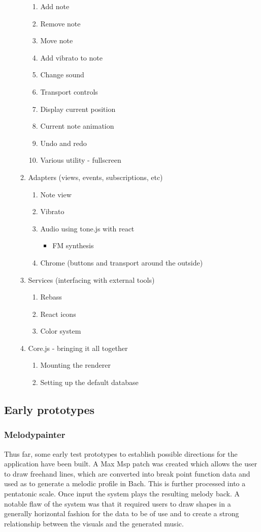 \documentclass[a4paper,12pt]{article}
\begin{document}
\begin{enumerate}
\begin{enumerate}
\begin{enumerate}
\item Add note
\item Remove note
\item Move note
\item Add vibrato to note
\item Change sound
\item Transport controls
\item Display current position
\item Current note animation
\item Undo and redo
\item Various utility - fullscreen
\end{enumerate}
\item Adapters (views, events, subscriptions, etc)
\begin{enumerate}
\item Note view
\item Vibrato
\item Audio using tone.js with react
\begin{itemize}
\item FM synthesis
\end{itemize}
\item Chrome (buttons and transport around the outside)
\end{enumerate}
\item Services (interfacing with external tools)
\begin{enumerate}
\item Rebass
\item React icons
\item Color system
\end{enumerate}
\item Core.js - bringing it all together
\begin{enumerate}
\item Mounting the renderer
\item Setting up the default database
\end{enumerate}
\end{enumerate}
\end{enumerate}

\subsection{Early prototypes}
\label{sec:org4b844ef}
\subsubsection{Melodypainter}
\label{sec:org25b5502}
Thus far, some early test prototypes to establish possible directions for the
application have been built. A Max Msp patch was created which allows the user
to draw freehand lines, which are converted into break point function data and
used as to generate a melodic profile in Bach. This is further processed into a
pentatonic scale. Once input the system plays the resulting melody back. A
notable flaw of the system was that it required users to draw shapes in a
generally horizontal fashion for the data to be of use and to create a strong
relationship between the visuals and the generated music.
\end{document}
